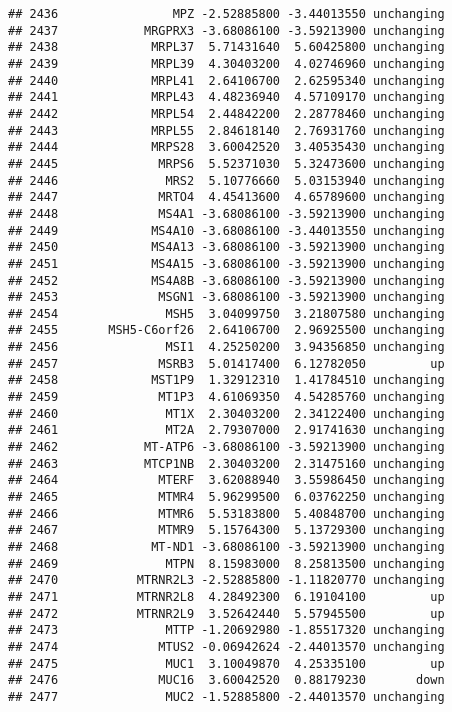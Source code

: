 \documentclass[]{article}
\begin{document}
\begin{verbatim}
## 2436                MPZ -2.52885800 -3.44013550 unchanging
## 2437            MRGPRX3 -3.68086100 -3.59213900 unchanging
## 2438             MRPL37  5.71431640  5.60425800 unchanging
## 2439             MRPL39  4.30403200  4.02746960 unchanging
## 2440             MRPL41  2.64106700  2.62595340 unchanging
## 2441             MRPL43  4.48236940  4.57109170 unchanging
## 2442             MRPL54  2.44842200  2.28778460 unchanging
## 2443             MRPL55  2.84618140  2.76931760 unchanging
## 2444             MRPS28  3.60042520  3.40535430 unchanging
## 2445              MRPS6  5.52371030  5.32473600 unchanging
## 2446               MRS2  5.10776660  5.03153940 unchanging
## 2447              MRTO4  4.45413600  4.65789600 unchanging
## 2448              MS4A1 -3.68086100 -3.59213900 unchanging
## 2449             MS4A10 -3.68086100 -3.44013550 unchanging
## 2450             MS4A13 -3.68086100 -3.59213900 unchanging
## 2451             MS4A15 -3.68086100 -3.59213900 unchanging
## 2452             MS4A8B -3.68086100 -3.59213900 unchanging
## 2453              MSGN1 -3.68086100 -3.59213900 unchanging
## 2454               MSH5  3.04099750  3.21807580 unchanging
## 2455       MSH5-C6orf26  2.64106700  2.96925500 unchanging
## 2456               MSI1  4.25250200  3.94356850 unchanging
## 2457              MSRB3  5.01417400  6.12782050         up
## 2458             MST1P9  1.32912310  1.41784510 unchanging
## 2459              MT1P3  4.61069350  4.54285760 unchanging
## 2460               MT1X  2.30403200  2.34122400 unchanging
## 2461               MT2A  2.79307000  2.91741630 unchanging
## 2462            MT-ATP6 -3.68086100 -3.59213900 unchanging
## 2463            MTCP1NB  2.30403200  2.31475160 unchanging
## 2464              MTERF  3.62088940  3.55986450 unchanging
## 2465              MTMR4  5.96299500  6.03762250 unchanging
## 2466              MTMR6  5.53183800  5.40848700 unchanging
## 2467              MTMR9  5.15764300  5.13729300 unchanging
## 2468             MT-ND1 -3.68086100 -3.59213900 unchanging
## 2469               MTPN  8.15983000  8.25813500 unchanging
## 2470           MTRNR2L3 -2.52885800 -1.11820770 unchanging
## 2471           MTRNR2L8  4.28492300  6.19104100         up
## 2472           MTRNR2L9  3.52642440  5.57945500         up
## 2473               MTTP -1.20692980 -1.85517320 unchanging
## 2474              MTUS2 -0.06942624 -2.44013570 unchanging
## 2475               MUC1  3.10049870  4.25335100         up
## 2476              MUC16  3.60042520  0.88179230       down
## 2477               MUC2 -1.52885800 -2.44013570 unchanging

\end{verbatim}
\end{document}
